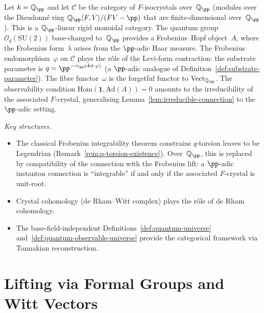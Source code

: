 \begin{example}
\label{ex:p-adic-realisation}
Let $k = \mathbb{Q}_\pp$ and let $\mathcal{C}$ be the category of
$F$-isocrystals over~$\mathbb{Q}_\pp$ (modules over the Dieudonn\'e ring
$\mathbb{Q}_\pp\langle F, V \rangle / (FV - \pp)$ that are finite-dimensional
over~$\mathbb{Q}_\pp$).
This is a $\mathbb{Q}_\pp$-linear rigid monoidal category.
The quantum group $\mathcal{O}_q(\mathrm{SU}(2))$ base-changed
to~$\mathbb{Q}_\pp$ provides a Frobenius--Hopf object~$A$, where the
Frobenius form~$\lambda$ arises from the $\pp$-adic Haar measure.
The Frobenius endomorphism~$\varphi$ on $\mathcal{C}$ plays the
r\^ole of the Levi-form contraction: the substrate parameter is
$q = \pp^{\,-v_\pp(\det\varphi)}$ (a $\pp$-adic analogue of
Definition~\ref{def:substrate-parameter}).  The fibre functor~$\omega$
is the forgetful functor to $\mathrm{Vect}_{\mathbb{Q}_\pp}$.
The observability condition
$\mathrm{Hom}(\mathbf{1}, \mathrm{Ad}(A)) = 0$ amounts to the
irreducibility of the associated $F$-crystal, generalising
Lemma~\ref{lem:irreducible-connection} to the $\pp$-adic setting.

\medskip\noindent\emph{Key structures.}
\begin{itemize}
  \item The classical Frobenius integrability theorem constrains
        $q$-torsion leaves to be Legendrian
        (Remark~\ref{rem:q-torsion-existence}).  Over~$\mathbb{Q}_\pp$,
        this is replaced by compatibility of the connection with the
        Frobenius lift: a $\pp$-adic instanton connection is
        ``integrable'' if and only if the associated $F$-crystal is
        unit-root.
  \item Crystal cohomology (de Rham--Witt complex) plays the r\^ole of
        de Rham cohomology.
  \item The base-field-independent
        Definitions~\ref{def:quantum-universe}
        and~\ref{def:quantum-observable-universe} provide the categorical
        framework via Tannakian reconstruction.
\end{itemize}
\end{example}


\section{Lifting via Formal Groups and Witt Vectors}
\label{sec:witt-vector-lifting}

